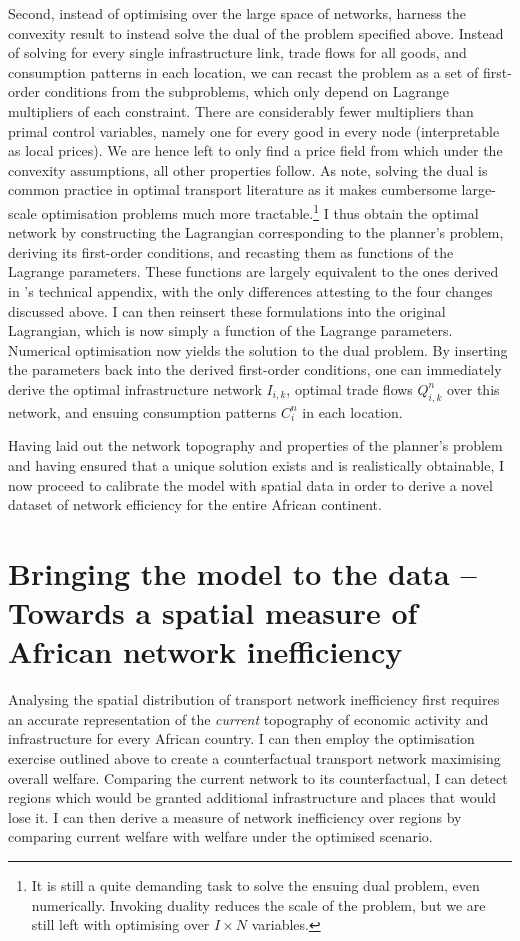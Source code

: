 \documentclass[11pt, oneside]{article}   	%
\begin{document}
Second, instead of optimising over the large space of networks, \citeauthor{fajgelbaum_optimal_2017} harness the convexity result to instead solve the dual of the problem specified above. Instead of solving for every single infrastructure link, trade flows for all goods, and consumption patterns in each location, we can recast the problem as a set of first-order conditions from the subproblems, which only depend on Lagrange multipliers of each constraint. There are considerably fewer multipliers than primal control variables, namely one for every good in every node (interpretable as local prices). We are hence left to only find a price field from which under the convexity assumptions, all other properties follow. As \citeauthor{fajgelbaum_optimal_2017} note, solving the dual is common practice in optimal transport literature as it makes cumbersome large-scale optimisation problems much more tractable.\footnote{It is still a quite demanding  task to solve the ensuing dual problem, even numerically. Invoking duality reduces the scale of the problem, but we are still left with optimising over $I \times N$ variables.} I thus obtain the optimal network by constructing the Lagrangian corresponding to the planner's problem, deriving its first-order conditions, and recasting them as functions of the Lagrange parameters. These functions are largely equivalent to the ones derived in \citeauthor{fajgelbaum_optimal_2017}'s technical appendix, with the only differences attesting to the four changes discussed above. I can then reinsert these formulations into the original Lagrangian, which is now simply a function of the Lagrange parameters. Numerical optimisation now yields the solution to the dual problem. By inserting the parameters back into the derived first-order conditions, one can immediately derive the optimal infrastructure network $I_{i,k}$, optimal trade flows $Q_{i,k}^{n}$ over this network, and ensuing consumption patterns $C_{i}^{n}$ in each location.

Having laid out the network topography and properties of the planner's problem and having ensured that a unique solution exists and is realistically obtainable, I now proceed to calibrate the model with spatial data in order to derive a novel dataset of network efficiency for the entire African continent.

\section{Bringing the model to the data -- Towards a spatial measure of African network inefficiency}
\label{chapter:calibration}
Analysing the spatial distribution of transport network inefficiency first requires an accurate representation of the \emph{current} topography of economic activity and infrastructure for every African country. I can then employ the \cite{fajgelbaum_optimal_2017} optimisation exercise outlined above to create a counterfactual transport network maximising overall welfare. Comparing the current network to its counterfactual, I can detect regions which would be granted additional infrastructure and places that would lose it. I can then derive a measure of network inefficiency over regions by comparing current welfare with welfare under the optimised scenario.
\end{document}
